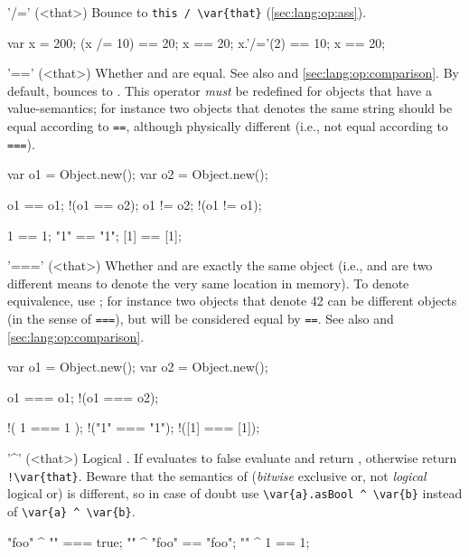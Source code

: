 \begin{urbiscriptapi}
\item['/='](<that>)%
  Bounce to \lstinline|this / \var{that}| (\autoref{sec:lang:op:ass}).
\begin{urbiassert}
var x = 200;
(x /= 10) == 20;  x == 20;
x.'/='(2) == 10;  x == 20;
\end{urbiassert}


\item['=='](<that>)%
  Whether \this and \that are equal.  See also  and
  \autoref{sec:lang:op:comparison}.  By default, bounces to
  .  This operator \emph{must} be redefined for objects that
  have a value-semantics; for instance two  objects that
  denotes the same string should be equal according to \lstinline|==|,
  although physically different (i.e., not equal according to
  \lstinline|===|).
\begin{urbiassert}
var o1 = Object.new();
var o2 = Object.new();

      o1 == o1;
    !(o1 == o2);
      o1 != o2;
    !(o1 != o1);

      1  ==  1;
     "1" == "1";
     [1] == [1];
\end{urbiassert}


\item['==='](<that>)%
  Whether \this and \that are exactly the same object (i.e., \this and \that
  are two different means to denote the very same location in memory).  To
  denote equivalence, use ; for instance two 
  objects that denote 42 can be different objects (in the sense of
  \lstinline|===|), but will be considered equal by \lstinline|==|.  See
  also  and \autoref{sec:lang:op:comparison}.
\begin{urbiassert}
var o1 = Object.new();
var o2 = Object.new();

      o1 === o1;
    !(o1 === o2);

    !( 1  ===  1 );
    !("1" === "1");
    !([1] === [1]);
\end{urbiassert}


\item['^'](<that>)%
  Logical . If \this evaluates to false evaluate and
  return , otherwise return \lstinline|!\var{that}|.  Beware that
  the semantics of  (\emph{bitwise} exclusive or, not
  \emph{logical} logical or) is different, so in case of doubt use
  \lstinline|\var{a}.asBool ^ \var{b}| instead of
  \lstinline|\var{a} ^ \var{b}|.
\begin{urbiassert}
"foo" ^ "" === true;
"" ^ "foo" == "foo";
"" ^ 1     == 1;


\end{urbiassert}
\end{urbiscriptapi}
